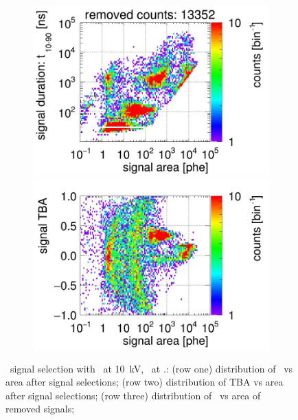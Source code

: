 \begin{landscape}
\begin{figure}[!p]
\begin{subfigure}[t]{0.33\textwidth}
			\includegraphics[width=\figurewidth,clip,trim={0 98 0 10}]{Figures/GasTest/CutsValid/res64766/pdpaX29Vecfig64766.jpg}
			\includegraphics[width=\figurewidth,clip,trim={0 0 0 40}]{Figures/GasTest/CutsValid/res64766/tbapaX29Vecfig64766.jpg}
			\caption{}
			\label{fig:signal selection dv 10 04}
		\end{subfigure}
		\caption[\gtest\ signal selection with \opdv\ at \SI{10}{\kV}, \opgd\ at \standarddensity .]{\gtest\ signal selection with \opdv\ at \SI{10}{\kV}, \opgd\ at \standarddensity .: 
			(row one) distribution of \rpdshort\ vs area after signal selections;
			(row two) distribution of TBA vs area after signal selections;
			(row three) distribution of \rpdshort\ vs area of removed signals;
}
\end{figure}
\end{landscape}

